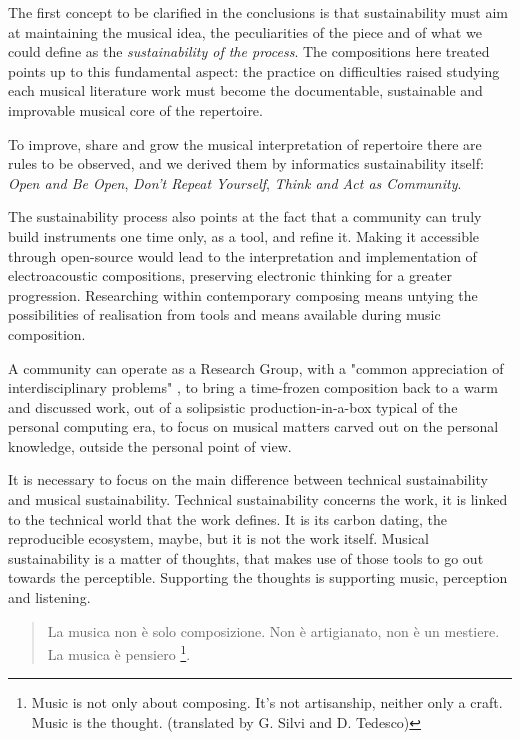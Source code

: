 \documentclass[twoside,a4paper]{article}
\begin{document}
The first concept to be clarified in the conclusions is that sustainability must
aim at maintaining the musical idea, the peculiarities of the piece and of what
we could define as the \emph{sustainability of the process}. The compositions
here treated points up to this fundamental aspect: the practice on difficulties
raised studying each musical literature work must become the documentable,
sustainable and improvable musical core of the repertoire.

To improve, share and grow the musical interpretation of repertoire there are
rules to be observed, and we derived them by informatics sustainability itself:
\emph{Open and Be Open}, \emph{Don't Repeat Yourself}, \emph{Think and Act as
Community}.

The sustainability process also points at the fact that a community can truly
build instruments one time only, as a tool, and refine it. Making it accessible
through open-source would lead to the interpretation and implementation of
electroacoustic compositions, preserving electronic thinking for a greater
progression. Researching within contemporary composing means untying the
possibilities of realisation from tools and means available during music
composition.

A community can operate as a Research Group, with a "common appreciation of
interdisciplinary problems" \cite{ml91}, to bring a time-frozen composition back
to a warm and discussed work, out of a solipsistic production-in-a-box typical
of the personal computing era, to focus on musical matters carved out on the
personal knowledge, outside the personal point of view.

It is necessary to focus on the main difference between technical sustainability
and musical sustainability. Technical sustainability concerns the work, it is
linked to the technical world that the work defines. It is its carbon dating, the
reproducible ecosystem, maybe, but it is not the work itself. Musical
sustainability is a matter of thoughts, that makes use of those tools to go out
towards the perceptible. Supporting the thoughts is supporting music, perception
and listening.

\begin{quote}
La musica non è solo composizione. Non è artigianato, non è un mestiere. La
musica è pensiero \cite{nono85}\footnote{Music is not only about composing.
It's not artisanship, neither only a craft. Music is the thought. (translated by
G. Silvi and D. Tedesco)}.
\end{quote}
%
\end{document}
